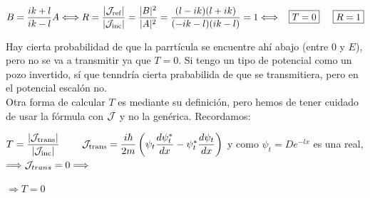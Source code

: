 \documentclass{report}
\begin{document}
{\begin{itemize}
\begin{itemize}
                          $B=\dfrac{ik+l}{ik-l}A\Longleftrightarrow R=\dfrac{\lvert\mathcal{J}_{\text{ref}}\rvert}{\lvert\mathcal{J}_{\text{inc}}\rvert}
                          =\dfrac{\lvert B\rvert^2}{\lvert A\rvert^2}=\dfrac{(l-ik)(l+ik)}{(-ik-l)(ik-l)}=1\Longleftrightarrow 
                          \hspace{0.3cm}\boxed{T=0}\hspace{0.5cm}\boxed{R=1}$
                        
                  \end{itemize}
                  Hay cierta probabilidad de que la parrtícula se encuentre ahí abajo (entre $0$ y $E$),
                  pero no se va a transmitir ya que $T=0$. Si tengo un tipo de potencial como un pozo invertido, 
                  sí que tenndría cierta prababilida de que se transmitiera, pero en el potencial escalón no.\\

                  Otra forma de calcular $T$ es mediante su definición, pero hemos de tener cuidado
                  de usar la fórmula con $\mathcal{J}$ y no la genérica. Recordamos:

                  $T=\dfrac{\lvert\mathcal{J}_{\text{trans}}\rvert}{\lvert\mathcal{J}_{\text{inc}}\rvert}\hspace{0.8cm}\mathcal{J}_{\text{trans}}=
                  \dfrac{i\hbar}{2m}\left(\psi_t\dfrac{d\psi_t^*}{dx}-\psi_t^*\dfrac{d\psi_t}{dx}\right)$
                  y como $\psi_t=De^{-lx}$ es una real, $\Longrightarrow\mathcal{J}_{trans}=0\Longrightarrow$ 
                  \vspace{-0.5cm}\begin{flushright}$\Longrightarrow\boxed{T=0}$\end{flushright}
        \end{itemize}
        }
\end{document}
